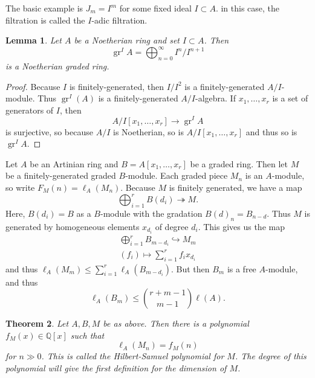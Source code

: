\documentclass[leqno, openany]{memoir}
\newtheorem{thm}{Theorem}[section]
\newtheorem{lem}[thm]{Lemma}
\theoremstyle{definition}
\theoremstyle{remark}
\theoremstyle{plain}
\theoremstyle{definition}
\theoremstyle{remark}
\newcommand{\Q}{\mathbb{Q}}
\begin{document}
The basic example is $J_m = I^m$ for some fixed ideal $I \subset A$. in this case, the filtration is called the $I$-adic filtration.

\begin{lem}
    Let $A$ be a Noetherian ring and set $I \subset A$. Then 
    \[ \operatorname{gr}^I A = \bigoplus_{n=0}^{\infty} I^n / I^{n+1} \]
    is a Noetherian graded ring.
\end{lem}

\begin{proof}
    Because $I$ is finitely-generated, then $I / I^2$ is a finitely-generated $A/I$-module. Thus $\operatorname{gr}^I(A)$ is a finitely-generated $A/I$-algebra. If $x_1, \ldots, x_r$ is a set of generators of $I$, then
    \[ A/I[x_1, \ldots, x_r] \to \operatorname{gr}^I A \]
    is surjective, so because $A/I$ is Noetherian, so is $A/I[x_1, \ldots, x_r]$ and thus so is $\operatorname{gr}^IA$.
\end{proof}

Let $A$ be an Artinian ring and $B = A[x_1, \ldots, x_r]$ be a graded ring. Then let $M$ be a finitely-generated graded $B$-module. Each graded piece $M_n$ is an $A$-module, so write $F_M(n) = \ell_A(M_n)$. Because $M$ is finitely generated, we have a map
\[ \bigoplus_{i=1}^r B(d_i) \twoheadrightarrow M. \]
Here, $B(d_i) = B$ as a $B$-module with the gradation $B(d)_n = B_{n-d}$. Thus $M$ is generated by homogeneous elements $x_{d_i}$ of degree $d_i$. This gives us the map
\begin{align*}
\bigoplus_{i=1}^r B_{m-d_i} \hookrightarrow M_m \\
(f_i) \mapsto \sum_{i=1}^r f_i x_{d_i} 
\end{align*}
and thus $\ell_A(M_m) \leq \sum_{i=1}^r \ell_A(B_{m-d_i})$. But then $B_m$ is a free $A$-module, and thus 
\[ \ell_A(B_m) \leq \binom{r+m-1}{m-1} \ell(A). \]

\begin{thm}
    Let $A, B,M$ be as above. Then there is a polynomial $f_M(x) \in \Q[x]$ such that
    \[ \ell_A(M_n) = f_M(n) \]
    for $n \gg 0$. This is called the \textit{Hilbert-Samuel polynomial} for $M$. The degree of this polynomial will give the first definition for the dimension of $M$. 
\end{thm}
\end{document}
